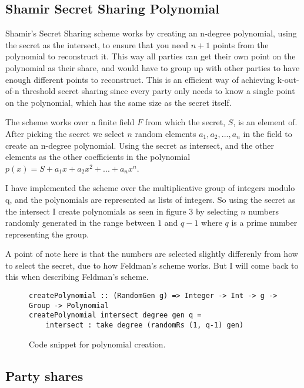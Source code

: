 \documentclass[a4paper,oneside,12pt,final]{article}
\begin{document}
\subsection{Shamir Secret Sharing Polynomial}

Shamir's Secret Sharing scheme works by creating an n-degree polynomial,
using the secret as the intersect, to ensure that you need $n+1$ points from the
polynomial to reconstruct it. This way all parties can get their own point on
the polynomial as their share, and would have to group up with other parties to
have enough different points to reconstruct. This is an efficient way of
achieving k-out-of-n threshold secret sharing since every party only needs to
know a single point on the polynomial, which has the same size as the secret
itself.

The scheme works over a finite field $F$ from which the secret, $S$, is an
element of. After picking the secret we select $n$ random elements $a_1, a_2,
..., a_n$ in the field to create an n-degree polynomial. Using the secret as
intersect, and the other elements as the other coefficients in the polynomial
$p(x) = S + a_1x + a_2x^2 + ... + a_nx^n$.

I have implemented the scheme over the multiplicative group of integers modulo
q, and the polynomials are represented as lists of integers. So using the secret
as the intersect I create polynomials as seen in figure 3 by selecting $n$
numbers randomly generated in the range between $1$ and $q-1$ where $q$ is a
prime number representing the group.

A point of note here is that the numbers are selected slightly
differenly from how to select the secret, due to how Feldman's scheme works. But
I will come back to this when describing Feldman's scheme.

\begin{figure}[h]
\label{fig:create-polynomial}
\begin{verbatim}
createPolynomial :: (RandomGen g) => Integer -> Int -> g -> Group -> Polynomial
createPolynomial intersect degree gen q =
    intersect : take degree (randomRs (1, q-1) gen)
\end{verbatim}
\caption{Code snippet for polynomial creation.}
\end{figure}

\subsection{Party shares}
\end{document}
